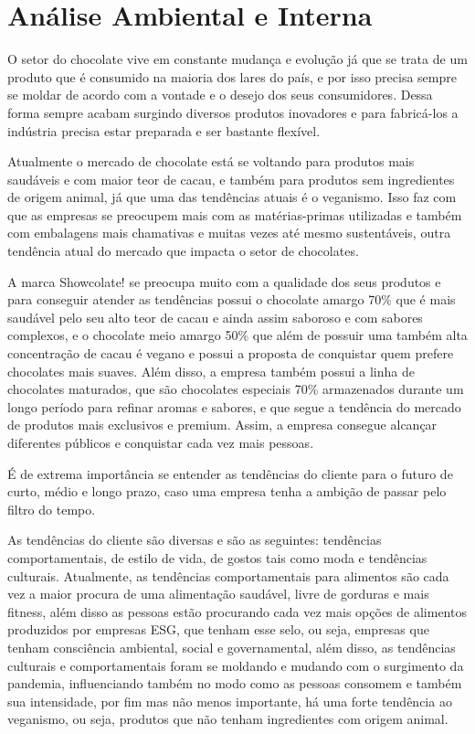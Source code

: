 \documentclass[
	12pt,				%
	openright,			%
	oneside,			%
	a4paper,			%
	english,			%
	french,				%
	spanish,			%
	brazil				%
	]{abntex2}
\begin{document}
\newpage
\chapter{Análise Ambiental e Interna}

O setor do chocolate vive em constante mudança e evolução já que se trata de um produto que é consumido na maioria dos lares do país, e por isso precisa sempre se moldar de acordo com a vontade e o desejo dos seus consumidores. Dessa forma sempre acabam surgindo diversos produtos inovadores e para fabricá-los a indústria precisa estar preparada e ser bastante flexível.

Atualmente o mercado de chocolate está se voltando para produtos mais saudáveis e com maior teor de cacau, e também para produtos sem ingredientes de origem animal, já que uma das tendências atuais é o veganismo. Isso faz com que as empresas se preocupem mais com as matérias-primas utilizadas e também com embalagens mais chamativas e muitas vezes até mesmo sustentáveis, outra tendência atual do mercado que impacta o setor de chocolates.

A marca Showcolate! se preocupa muito com a qualidade dos seus produtos e para conseguir atender as tendências possui o chocolate amargo 70$\%$ que é mais saudável pelo seu alto teor de cacau e ainda assim saboroso e com sabores complexos, e o chocolate meio amargo 50$\%$ que além de possuir uma também alta concentração de cacau é vegano e possui a proposta de conquistar quem prefere chocolates mais suaves. Além disso, a empresa também possui a linha de chocolates maturados, que são chocolates especiais 70$\%$ armazenados durante um longo período para refinar aromas e sabores, e que segue a tendência do mercado de produtos mais exclusivos e premium. Assim, a empresa consegue alcançar diferentes públicos e conquistar cada vez mais pessoas.

É de extrema importância se entender as tendências do cliente para o futuro de curto, médio e longo prazo, caso uma empresa tenha a ambição de passar pelo filtro do tempo.
	
	As tendências do cliente são diversas e são as seguintes: tendências comportamentais, de estilo de vida, de gostos tais como moda e tendências culturais. Atualmente, as tendências comportamentais para alimentos são cada vez a maior procura de uma alimentação saudável, livre de gorduras e mais fitness, além disso as pessoas estão procurando cada vez mais opções de alimentos produzidos por empresas ESG, que tenham esse selo, ou seja, empresas que tenham consciência ambiental, social e governamental, além disso, as tendências culturais e comportamentais foram se moldando e mudando com o surgimento da pandemia, influenciando também no modo como as pessoas consomem e também sua intensidade, por fim mas não menos importante, há uma forte tendência ao veganismo, ou seja, produtos que não tenham ingredientes com origem animal. 
	
\end{document}
